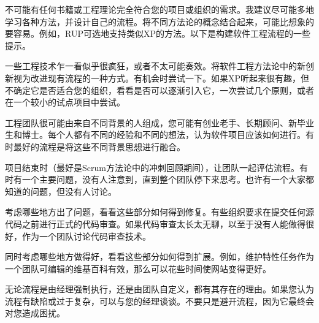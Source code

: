 
不可能有任何书籍或工程理论完全符合您的项目或组织的需求。我建议尽可能多地学习各种方法，并设计自己的流程。将不同方法论的概念结合起来，可能比想象的要容易。例如，RUP可选地支持类似XP的方法。以下是构建软件工程流程的一些提示。


一些工程技术乍一看似乎很疯狂，或者不太可能奏效。将软件工程方法论中的新创新视为改进现有流程的一种方式。有机会时尝试一下。如果XP听起来很有趣，但不确定它是否适合您的组织，看看是否可以逐渐引入它，一次尝试几个原则，或者在一个较小的试点项目中尝试。


工程团队很可能由来自不同背景的人组成，您可能有创业老手、长期顾问、新毕业生和博士。每个人都有不同的经验和不同的想法，认为软件项目应该如何进行。有时最好的流程是将这些不同背景思想进行融合。


项目结束时（最好是Scrum方法论中的冲刺回顾期间），让团队一起评估流程。有时有一个主要问题，没有人注意到，直到整个团队停下来思考。也许有一个大家都知道的问题，但没有人讨论。

考虑哪些地方出了问题，看看这些部分如何得到修复。有些组织要求在提交任何源代码之前进行正式的代码审查。如果代码审查太长太无聊，以至于没有人能做得很好，作为一个团队讨论代码审查技术。

同时考虑哪些地方做得好，看看这些部分如何得到扩展。例如，维护特性任务作为一个团队可编辑的维基百科有效，那么可以花些时间使网站变得更好。


无论流程是由经理强制执行，还是由团队自定义，都有其存在的理由。如果您认为流程有缺陷或过于复杂，可以与您的经理谈谈。不要只是避开流程，因为它最终会对您造成困扰。


